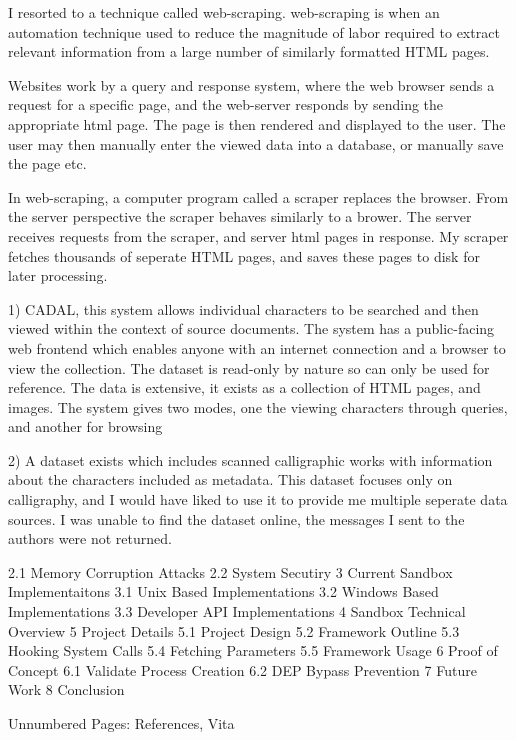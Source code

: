     I resorted to a technique called web-scraping.  web-scraping is when an automation technique used to reduce the magnitude of labor required to extract relevant information from a large number of similarly formatted HTML pages.
    
    Websites work by a query and response system, where the web browser sends a request for a specific page, and the web-server responds by sending the appropriate html page.  The page is then rendered and displayed to the user.  The user may then manually enter the viewed data into a database, or manually save the page etc.
    
    In web-scraping, a computer program called a scraper replaces the browser.  From the server perspective the scraper behaves similarly to a brower.   The server receives requests from the scraper, and server html pages in response.  My scraper fetches thousands of seperate HTML pages, and saves these pages to disk for later processing.
    
    
    
    
    
    

1)  CADAL, this system allows individual characters to be searched and then viewed within the context of source documents.  The system has a public-facing web frontend which enables anyone with an internet connection and a browser to view the collection.  The dataset is read-only by nature so can only be used for reference.  The data is extensive, it exists as a collection of HTML pages, and images.  The system gives two modes, one the viewing characters through queries, and another for browsing 

2)  A dataset exists which includes scanned calligraphic works with information about the characters included as metadata.  This dataset focuses only on calligraphy, and I would have liked to use it to provide me multiple seperate data sources. I was unable to find the dataset online, the messages I sent to the authors were not returned.






2.1     Memory Corruption Attacks
2.2     System Secutiry
3       Current Sandbox Implementaitons
3.1     Unix Based Implementations
3.2     Windows Based Implementations
3.3     Developer API Implementations
4       Sandbox Technical Overview
5       Project Details
5.1     Project Design
5.2     Framework Outline
5.3     Hooking System Calls
5.4     Fetching Parameters
5.5     Framework Usage
6       Proof of Concept
6.1     Validate Process Creation
6.2     DEP Bypass Prevention
7       Future Work
8       Conclusion

Unnumbered Pages: References, Vita

